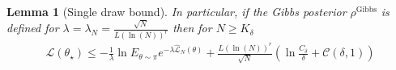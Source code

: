 \documentclass{article}
\newcommand{\train}{\mathcal{D}}
\newtheorem{lemma}[theorem]{Lemma}
\newcommand{\bE}{\mathbf{E}}
\begin{document}
\begin{lemma}[Single draw bound]
  In particular, if the Gibbs posterior $\rho^{\text{Gibbs}}$ is defined for 
  $\lambda=\lambda_N=\frac{\sqrt{N}}{L(\ln(N))^r}$ then for $N \ge K_{\delta}$
\begin{equation}
\label{RenyiBound:single_draw:giibs1}
\begin{aligned}
 \mathcal{L}(\theta_{\star}) \le  %
  -\frac{1}{\lambda} \ln E_{\theta \sim \pi} e^{-\lambda \hat{\mathcal{L}}_N(\theta)} + 
 \frac{L(\ln(N))^{r}}{\sqrt{N}}\left(\ln\frac{C_{\delta}}{\delta} +  \mathcal{C}(\delta,1)\right)
\end{aligned}
\end{equation}
  \end{lemma}
\end{document}
